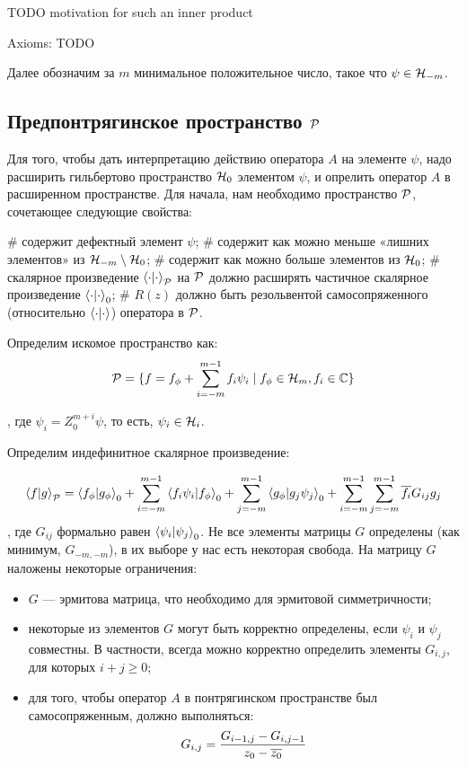 TODO motivation for such an inner product

Axioms: TODO


Далее обозначим за $m$ минимальное положительное число, такое что $\psi \in \mathcal{H}_{-m}$.

\subsection{Предпонтрягинское пространство $\mathcal{P}$}
Для того, чтобы дать интерпретацию действию оператора $A$ на элементе $\psi$, надо расширить гильбертово пространство $\mathcal{H}_{0}$ элементом $\psi$, и опрелить оператор $A$ в расширенном пространстве. Для начала, нам необходимо пространство $\mathcal{P}$, сочетающее следующие свойства:

\begin{elist}
# содержит дефектный элемент $\psi$;
# содержит как можно меньше «лишних элементов» из  $\mathcal{H}_{-m} \setminus \mathcal{H}_{0}$;
# содержит как можно больше элементов из $\mathcal{H}_{0}$;
# скалярное произведение $\ipcdot_\mcP$ на $\mathcal{P}$ должно расширять частичное скалярное произведение $\ipcdot_0$;
# $R(z)$ должно быть резольвентой самосопряженного (относительно $\ipcdot$) оператора в $\mathcal{P}$.
\end{elist}

Определим искомое пространство как:
\[
\mathcal{P} = 
\{ f = f_\phi + \sum\limits_{i = -m}^{m - 1} f_i \psi_i \mid f_\phi \in \mathcal{H}_{m}, f_i \in \mathbb{C}\}
\]

, где $\psi_i = Z_0^{m + i} \psi$, то есть, $\psi_i \in \mathcal{H}_{i}$.

Определим индефинитное скалярное произведение:

\[
\ip{f}{g}_\mcP =
\ip{f_\phi}{g_\phi}_0 +
\sum\limits_{i = -m}^{m - 1} \ip{f_i \psi_i}{f_\phi}_0 +
\sum\limits_{j = -m}^{m - 1} \ip{g_\phi}{g_j \psi_j}_0 +
\sum\limits_{i = -m}^{m - 1} \sum\limits_{j = -m}^{m - 1} \cconj{f_i} G_{ij} g_j
\]
, где $G_{ij}$ формально равен $\ip{\psi_i}{\psi_j}_0$. Не все элементы матрицы $G$ определены (как минимум, $G_{-m, -m}$), в их выборе у нас есть некоторая свобода. На матрицу $G$ наложены некоторые ограничения:

\begin{itemize}
\item $G$ — эрмитова матрица, что необходимо для эрмитовой симметричности;
\item некоторые из элементов $G$ могут быть корректно определены, если $\psi_i$ и $\psi_j$ совместны. В частности, всегда можно корректно определить элементы $G_{i, j}$, для которых $i + j \ge 0$;
\item для того, чтобы оператор $A$ в понтрягинском пространстве был самосопряженным, должно выполняться:
\[
G_{i, j} = \frac{G_{i - 1, j} - G_{i, j - 1}}{z_0 - \overline{z_0}}
\]
\end{itemize}


